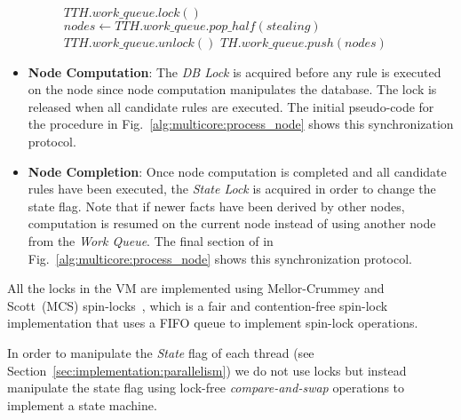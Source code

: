 \begin{itemize}
\begin{figure}
\begin{algorithm}[H]
   $TTH.work\_queue.lock()$\;
   $nodes \longleftarrow TTH.work\_queue.pop\_half(stealing)$\;
   $TTH.work\_queue.unlock()$\;
   $TH.work\_queue.push(nodes)$\;
\end{algorithm}
 \label{alg:multicore:steal_nodes}
\end{figure}

   \item \textbf{Node Computation}: The \emph{DB Lock} is acquired before any
      rule is executed on the node since node computation manipulates the
      database. The lock is released when all candidate rules are executed. The
      initial pseudo-code for the  procedure in
      Fig.~\ref{alg:multicore:process_node} shows this synchronization protocol.

   \item \textbf{Node Completion}: Once node computation is completed and all
      candidate rules have been executed, the \emph{State Lock} is acquired in
      order to change the state flag. Note that if newer facts have been derived
      by other nodes, computation is resumed on the current node instead of
      using another node from the \emph{Work Queue}. The final section of
       in Fig.~\ref{alg:multicore:process_node} shows this
      synchronization protocol.

\end{itemize}

All the locks in the VM are implemented using Mellor-Crummey and Scott~(MCS)
spin-locks~\cite{Mellor-Crummey:1991}, which is a fair and contention-free
spin-lock implementation that uses a FIFO queue to implement spin-lock operations.

In order to manipulate the \emph{State} flag of each thread (see
Section~\ref{sec:implementation:parallelism}) we do not use locks but instead
manipulate the state flag using lock-free \emph{compare-and-swap} operations to
implement a state machine.

